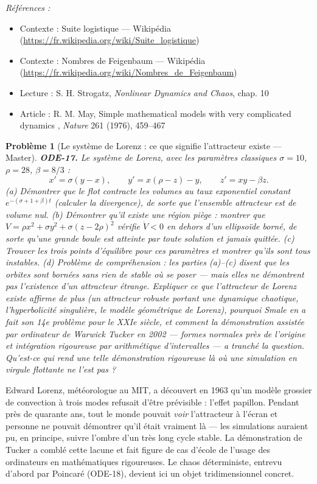 \documentclass[11pt]{article}
\newtheorem{problem}{Problème}
\newenvironment{refs}{\par\small\noindent\emph{Références :}\begin{itemize}\setlength\itemsep{0pt}}{\end{itemize}\normalsize}
\begin{document}
\begin{refs}
\item Contexte : Suite logistique --- Wikipédia (\url{https://fr.wikipedia.org/wiki/Suite_logistique})
\item Contexte : Nombres de Feigenbaum --- Wikipédia (\url{https://fr.wikipedia.org/wiki/Nombres_de_Feigenbaum})
\item Lecture : S. H. Strogatz, \textit{Nonlinear Dynamics and Chaos}, chap. 10
\item Article : R. M. May, \og{} Simple mathematical models with very complicated dynamics \fg{}, \textit{Nature} 261 (1976), 459--467
\end{refs}

\bigskip

\begin{problem}[{Le système de Lorenz : ce que signifie \og{} l'attracteur existe \fg{} --- Master}]
\textbf{ODE-17.} Le système de Lorenz, avec les paramètres classiques
$ \sigma = 10 $, $ \rho = 28 $, $ \beta = 8/3 $ :
\[ x' = \sigma (y - x), \qquad y' = x (\rho - z) - y, \qquad z' = x y - \beta z . \]
(a) Démontrer que le flot contracte les volumes au taux exponentiel constant
$ e^{-(\sigma + 1 + \beta) t} $ (calculer la divergence), de sorte que l'ensemble attracteur est
de volume nul.
(b) Démontrer qu'il existe une région piège : montrer que
$ V = \rho x^2 + \sigma y^2 + \sigma (z - 2\rho)^2 $ vérifie $ \dot{V} <0 $ en dehors d'un
ellipsoïde borné, de sorte qu'une grande boule est atteinte par toute solution et jamais
quittée.
(c) Trouver les trois points d'équilibre pour ces paramètres et montrer qu'ils sont tous
instables.
(d) Problème de compréhension : les parties (a)--(c) disent que les orbites sont bornées sans rien
de stable où se poser --- mais elles ne démontrent \textit{pas} l'existence d'un attracteur étrange.
Expliquer ce que \og{} l'attracteur de Lorenz existe \fg{} affirme de plus (un attracteur robuste portant
une dynamique chaotique, l'hyperbolicité singulière, le modèle géométrique de Lorenz), pourquoi
Smale en a fait son 14e problème pour le XXIe siècle, et comment la
démonstration assistée par ordinateur de Warwick Tucker en 2002 --- formes normales près de
l'origine et intégration rigoureuse par arithmétique d'intervalles --- a tranché la question.
Qu'est-ce qui rend une telle démonstration rigoureuse là où une simulation en virgule flottante ne
l'est pas ?
\end{problem}

\noindent Edward Lorenz, météorologue au MIT, a découvert en 1963 qu'un modèle grossier
de convection à trois modes refusait d'être prévisible : l'effet papillon. Pendant près de
quarante ans, tout le monde pouvait \textit{voir} l'attracteur à l'écran et personne ne pouvait
démontrer qu'il était vraiment là --- les simulations auraient pu, en principe, suivre l'ombre d'un
très long cycle stable. La démonstration de Tucker a comblé cette lacune et fait figure de cas
d'école de l'usage des ordinateurs en mathématiques rigoureuses. Le chaos déterministe, entrevu
d'abord par Poincaré (ODE-18), devient ici un objet tridimensionnel concret.
\end{document}
